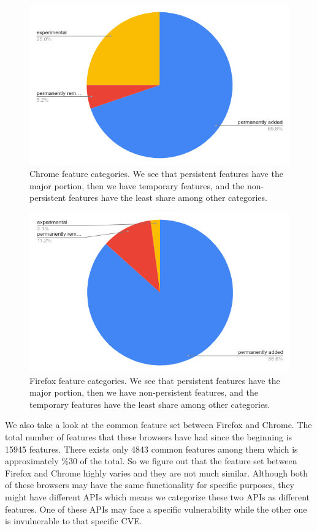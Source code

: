 \begin{figure}[ht]
    \centering
    \includegraphics[width=\columnwidth]{figures/Chrome-feature-categories.png}
    \caption{Chrome feature categories. We see that persistent features have the major portion, then we have temporary features, and the non-persistent features have the least share among other categories.}
    \label{fig:chrome-categories}
\end{figure}

\begin{figure}[ht]
    \centering
    \includegraphics[width=\columnwidth]{figures/Firefox-feature-categories.png}
    \caption{Firefox feature categories. We see that persistent features have the major portion, then we have non-persistent features, and the temporary features have the least share among other categories.}
    \label{fig:firefox-categories}
\end{figure}

We also take a look at the common feature set between Firefox and Chrome. The total number of features that these browsers have had since the beginning is 15945 features. There exists only 4843 common features among them which is approximately \%30 of the total. So we figure out that the feature set between Firefox and Chrome highly varies and they are not much similar. Although both of these browsers may have the same functionality for specific purposes, they might have different APIs which means we categorize these two APIs as different features. One of these APIs may face a specific vulnerability while the other one is invulnerable to that specific CVE.

